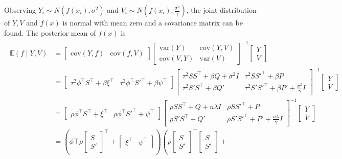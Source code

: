 Observing $Y_i\sim N(f (x_i),\sigma^2)$ and $V_i\sim N(f (x_i),\frac{\sigma^2}{\gamma})$, the joint distribution of $Y,V$ and $f(x)$ is normal with mean zero and a covariance matrix can be found. The posterior mean of $f(x)$ is 
\begin{align}\label{rhoeq}
\begin{split}
\mathbb{E}(f \mid  Y,V)&=
\begin{bmatrix}
\mbox{cov}(Y,f) & \mbox{cov}(f,V)
\end{bmatrix}\begin{bmatrix}
\mbox{var}(Y) & \mbox{cov}(Y,V)\\
\mbox{cov}(V,Y) & \mbox{var}(V)
\end{bmatrix}^{-1}\begin{bmatrix}
Y\\V
\end{bmatrix}\\
&=
\begin{bmatrix}
\tau^2 \phi^\top S^\top+\beta \xi^\top & \tau^2  \phi^\top S'^\top+\beta \psi^\top 
\end{bmatrix}\begin{bmatrix}
\tau^2 SS^\top+\beta Q+\sigma^2 I& \tau^2 SS'^\top+\beta P\\
\tau^2 S'S^\top+\beta Q'& \tau^2 S'S'^\top+\beta P'+\frac{\sigma^2}{\gamma}I
\end{bmatrix}^{-1}\begin{bmatrix}
Y\\V
\end{bmatrix}\\
&=
\begin{bmatrix}
\rho\phi^\top S^\top+ \xi^\top & \rho\phi^\top S'^\top+\psi^\top
\end{bmatrix}\begin{bmatrix}
\rho SS^\top+Q+n\lambda I& \rho SS'^\top+P\\
\rho S'S^\top+Q'& \rho S'S'^\top+P'+\frac{n\lambda}{\gamma}I
\end{bmatrix}^{-1}\begin{bmatrix}
Y\\V
\end{bmatrix}\\
&=(\phi\top \rho 
\begin{bmatrix} S\\ S' \end{bmatrix}^\top + \begin{bmatrix} \xi^\top & \psi^\top\end{bmatrix})
\left(\rho\begin{bmatrix} S \\ S' \end{bmatrix}^\top \begin{bmatrix} S \\ S' \end{bmatrix}+

\end{split}
\end{align}

